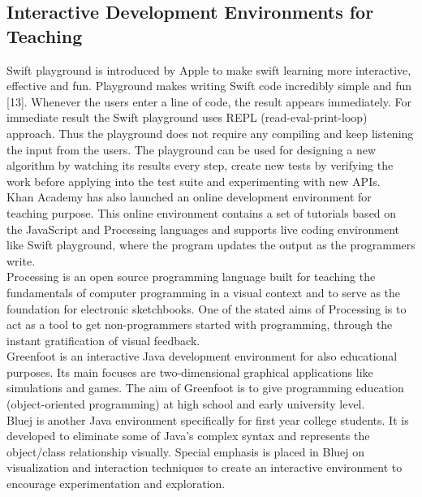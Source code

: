 \subsection{Interactive Development Environments for Teaching}

Swift playground is introduced by Apple to make swift learning more interactive, effective and fun. Playground makes writing Swift code incredibly simple and fun [13]. Whenever the users enter a line of code, the result appears immediately. For immediate result the Swift playground uses REPL (read-eval-print-loop) approach. Thus the playground does not require any compiling and keep listening the input from the users. The playground can be used for designing a new algorithm by watching its results every step, create new tests by verifying the work before applying into the test suite and experimenting with new APIs. \\

Khan Academy has also launched an online development environment for teaching purpose. This online environment contains a set of tutorials based on the JavaScript and Processing languages and supports live coding environment like Swift playground, where the program updates the output as the programmers write. \\

Processing is an open source programming language built for teaching the fundamentals of computer programming in a visual context and to serve as the foundation for electronic sketchbooks. One of the stated aims of Processing is to act as a tool to get non-programmers started with programming, through the instant gratification of visual feedback. \\

Greenfoot is an interactive Java development environment for also educational purposes. Its main focuses are two-dimensional graphical applications like simulations and games. The aim of Greenfoot is to give programming education (object-oriented programming) at high school and early university level. \\

Bluej is another Java environment specifically for first year college students. It is developed to eliminate some of Java's complex syntax and represents the object/class relationship visually. Special emphasis is placed in Bluej on visualization and interaction techniques to create an interactive environment to encourage experimentation and exploration. \\

